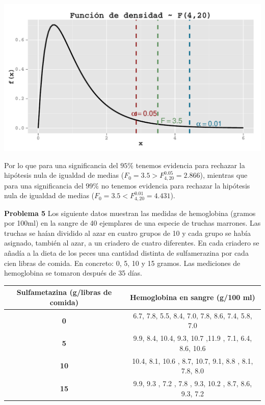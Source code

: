 \documentclass[a4paper]{scrartcl}\usepackage[]{graphicx}\usepackage[]{color}
\makeatletter
\def\maxwidth{ %
  \ifdim\Gin@nat@width>\linewidth
    \linewidth
  \else
    \Gin@nat@width
  \fi
}
\newenvironment{knitrout}{}{} %
\makeatother
\begin{document}
\begin{knitrout}
\color{fgcolor}

{\centering \includegraphics[width=\maxwidth]{figure/unnamed-chunk-12} 

}



\end{knitrout}

\noindent Por lo que para una significancia del $95\%$ tenemos evidencia para rechazar la hipótesis nula de igualdad de medias ($F_0 = 3.5 >  F_{4,20}^{0.05} = 2.866$), mientras que para una significancia del $99\%$ no tenemos evidencia para rechazar la hipótesis nula de igualdad de medias ($F_0 = 3.5 <  F_{4,20}^{0.01} = 4.431$).


\newpage
\textbf{Problema 5}
Los siguiente datos muestran las medidas de hemoglobina (gramos por 100ml) en la sangre de 40 ejemplares de una especie de truchas marrones. Las truchas se haían dividido al azar en cuatro grupos de 10 y cada grupo se había asignado, también al azar, a un criadero de cuatro diferentes. En cada criadero se añadía a la dieta de los peces una cantidad distinta de sulfamerazina por cada cien libras de comida. En concreto: 0, 5, 10 y 15 gramos. Las mediciones de hemoglobina se tomaron después de 35 días.

\begin{table}[h!]
\centering
\begin{tabular}[t]{|c|c|}
\hline
\textbf{Sulfametazina }(g/libras de comida)&\textbf{Hemoglobina en sangre} (g/100 ml)\\ 
\hline
\textbf{0}&6.7,  7.8,  5.5,  8.4,  7.0,  7.8,  8.6,  7.4,  5.8,  7.0\\
\hline
\textbf{5}&9.9,  8.4, 10.4,  9.3,  10.7  ,11.9 , 7.1,  6.4,  8.6,  10.6\\
\hline
\textbf{10}&10.4,  8.1, 10.6 , 8.7,  10.7,  9.1,  8.8 , 8.1,  7.8,  8.0\\
\hline
\textbf{15}&9.9,  9.3 , 7.2 , 7.8 , 9.3,  10.2 , 8.7,  8.6, 9.3,  7.2 \\
\hline
\end{tabular}
\end{table}
\end{document}
